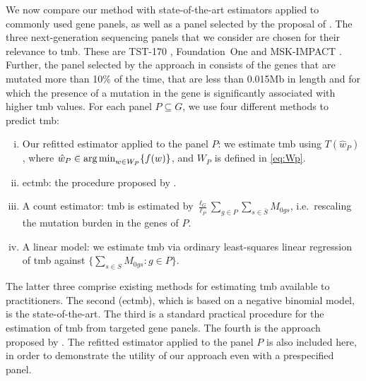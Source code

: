 \documentclass[../thesis.tex]{subfiles}
\begin{document}
We now compare our method with state-of-the-art estimators applied to commonly used gene panels{, as well as a panel selected by the proposal of \citet{lyu_mutation_2018}.} The three next-generation sequencing panels that we consider are chosen for their relevance to \gls{tmb}. These are TST-170 \citep{heydt_evaluation_2018}, Foundation~One \citep{frampton_development_2013} and MSK-IMPACT \citep{cheng_memorial_2015}. {Further, the panel selected by the approach in \citet{lyu_mutation_2018} consists of the genes that are mutated more than 10$\%$ of the time, that are less than 0.015Mb in length and for which the presence of a mutation in the gene is significantly associated with higher \gls{tmb} values.} For each panel $P \subseteq G$, we use four different methods to predict \gls{tmb}:
\begin{enumerate}[(i)]
 \item Our refitted estimator applied to the panel $P$: we estimate \gls{tmb} using $T(\hat{w}_P)$, where $\hat{w}_P \in \operatorname*{arg\,min}_{w \in W_P} \{f(w)\}$, and $W_P$ is defined in \eqref{eq:Wp}. 
 \item \gls{ectmb}: the procedure proposed by \citet{yao_ectmb_2020}.
 \item A count estimator: \gls{tmb} is estimated by $\frac{\ell_G}{\ell_P} \sum_{g \in P} \sum_{s \in \bar{S}}M_{0gs}$, i.e.~rescaling the mutation burden in the genes of $P$. 
 \item A linear model: we estimate \gls{tmb} via ordinary least-squares linear regression of \gls{tmb} against $\bigl\{\sum_{s\in S} M_{0gs}: g \in P \bigr\}$.
\end{enumerate}
The latter three comprise existing methods for estimating \gls{tmb} available to practitioners. The second (\gls{ectmb}), which is based on a negative binomial model, is the state-of-the-art. The third is a standard practical procedure for the estimation of \gls{tmb} from targeted gene panels. {The fourth is the approach proposed by \citet{lyu_mutation_2018}.} The refitted estimator applied to the panel $P$ is also included here, in order to demonstrate the utility of our approach even with a prespecified panel.
\end{document}
